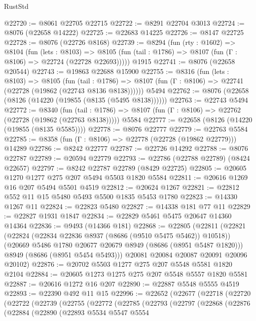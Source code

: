 \begin{lexlean}{RustStd}
\begin{coremodule}
@22720 := @8061 @22705 @22715
@22722 := @8291 @22704 @3013
@22724 := @8076 (@22658 @14222)
@22725 := @22683 @14225
@22726 := @8147 @22725
@22728 := @8076 (@22726 @8168)
@22739 := @8294
    (fun (rty : @1602) =>
    @8104
      (fun (lets : @8103) =>
      @8105 (fun (tail : @1786) => @8107 (fun (Γ : @8106) => @22724 (@22728 @22693)))))
    @1915
@22741 := @8076 (@22658 @20544)
@22743 := @19863 @22688 @15900
@22755 := @8316
    (fun (lets : @8103) =>
    @8105
      (fun (tail : @1786) =>
      @8107 (fun (Γ : @8106) => @22741 (@22728 (@19862 (@22743 @8136 @8138))))))
    @5494
@22762 := @8076 (@22658 (@8126 (@14220 (@19855 (@8135 (@5495 @8138))))))
@22763 := @22743 @5494
@22772 := @8340
    (fun (tail : @1786) => @8107 (fun (Γ : @8106) => @22762 (@22728 (@19862 (@22763 @8138)))))
    @5584
@22777 := @22658 (@8126 (@14220 (@19855 (@8135 @5585))))
@22778 := @8076 @22777
@22779 := @22763 @5584
@22785 := @8358 (fun (Γ : @8106) => @22778 (@22728 (@19862 @22779))) @14289
@22786 := @8242 @22777
@22787 := @22726 @14292
@22788 := @8076 @22787
@22789 := @20594 @22779
@22793 := @22786 (@22788 @22789) (@8424 @22657)
@22797 := @8242 @22787 @22789 (@8429 @22725)
@22805 := @20605 @1270 @1277 @275 @207 @5494 @5503 @1820 @5584
@22811 := @20616 @1269 @16 @207 @5494 @5501 @4519
@22812 := @20624 @1267
@22821 := @22812 @552 @11 @15 @5480 @5493 @5500 @1835 @5453 @1780
@22823 := @14330 @1267 @11
@22824 := @22823 @5480
@22827 := @14338 @181 @77 @11
@22829 := @22827 @1931 @1847
@22834 := @22829 @5461 @5475 @20647 @14360 @14364
@22836 := @9493 (@14366 @181)
@22868 := @22805
    (@22811
      (@22821
        (@22824 (@22834 @22836 @8937 (@8686 (@9510 @5475 @5462)) @10518))
        (@20669 @5486 @1780 @20677 @20679 @8949 (@8686 (@8951 @5487 @1820)))
        @8949
        (@8686 (@8951 @5454 @5493)))
      @20081
      @20084
      @20087
      @20091
      @20096
      @20102)
@22876 := @20702 @5503 @1277 @275 @207 @5548 @5581 @1820 @2104
@22884 := @20605 @1273 @1275 @275 @207 @5548 @5557 @1820 @5581
@22887 := @20616 @1272 @16 @207
@22890 := @22887 @5548 @5555 @4519
@22893 := @22390 @492 @11 @15
@22996 := @22652
    (@22677
      (@22718
        (@22720
          (@22722
            (@22739
              (@22755
                (@22772
                  (@22785
                    (@22793
                      (@22797
                        (@22868
                          (@22876
                            (@22884
                              (@22890
                                (@22893
                                  @5534
                                  @5547
                                  @5554

\end{coremodule}
\end{lexlean}
